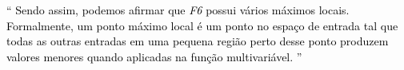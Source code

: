 \documentclass{article}
\begin{document}
\begin{figure}[H]
\begin{floatrow}
{			
		}
	\end{floatrow}
\end{figure}

\newpage
\begin{flushleft}
	\textcolor{black}{
		``
		Sendo assim, podemos afirmar que \emph{F6} possui vários
		máximos locais. Formalmente, um ponto máximo local é um
		ponto no espaço de entrada tal que todas as outras entradas
		em uma pequena região perto desse ponto produzem valores
		menores quando aplicadas na função multivariável.
		''
	}
\end{flushleft}
\end{document}
